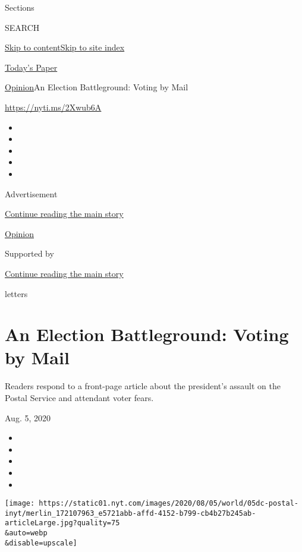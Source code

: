 Sections

SEARCH

\protect\hyperlink{site-content}{Skip to
content}\protect\hyperlink{site-index}{Skip to site index}

\href{https://myaccount.nytimes.com/auth/login?response_type=cookie\&client_id=vi}{}

\href{https://www.nytimes.com/section/todayspaper}{Today's Paper}

\href{/section/opinion}{Opinion}\textbar{}An Election Battleground:
Voting by Mail

\href{https://nyti.ms/2Xwub6A}{https://nyti.ms/2Xwub6A}

\begin{itemize}
\item
\item
\item
\item
\item
\end{itemize}

Advertisement

\protect\hyperlink{after-top}{Continue reading the main story}

\href{/section/opinion}{Opinion}

Supported by

\protect\hyperlink{after-sponsor}{Continue reading the main story}

letters

\hypertarget{an-election-battleground-voting-by-mail}{%
\section{An Election Battleground: Voting by
Mail}\label{an-election-battleground-voting-by-mail}}

Readers respond to a front-page article about the president's assault on
the Postal Service and attendant voter fears.

Aug. 5, 2020

\begin{itemize}
\item
\item
\item
\item
\item
\end{itemize}

\texttt{[image: https://static01.nyt.com/images/2020/08/05/world/05dc-postal-inyt/merlin\_172107963\_e5721abb-affd-4152-b799-cb4b27b245ab-articleLarge.jpg?quality=75\\\&auto=webp\\\&disable=upscale]}

